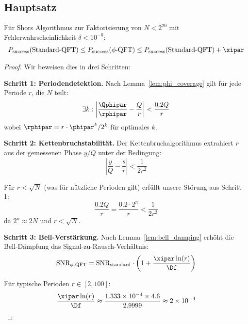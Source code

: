 \subsection{Hauptsatz}

\begin{theorem}
	\label{thm:main}
	Für Shors Algorithmus zur Faktorisierung von $N < 2^{20}$ mit Fehlerwahrscheinlichkeit $\delta < 10^{-6}$:
	\begin{equation}
		P_{\text{success}}(\text{Standard-QFT}) \leq P_{\text{success}}(\text{$\phi$-QFT}) \leq P_{\text{success}}(\text{Standard-QFT}) + \xipar
	\end{equation}
\end{theorem}

\begin{proof}
	Wir beweisen dies in drei Schritten:
	
	\textbf{Schritt 1: Periodendetektion.}
	Nach Lemma~\ref{lem:phi_coverage} gilt für jede Periode $r$, die $N$ teilt:
	\begin{equation}
		\exists k: \left|\frac{\Qphipar}{\rphipar} - \frac{Q}{r}\right| < \frac{0.2Q}{r}
	\end{equation}
	wobei $\rphipar = r \cdot \phipar^k/2^k$ für optimales $k$.
	
	\textbf{Schritt 2: Kettenbruchstabilität.}
	Der Kettenbruchalgorithmus extrahiert $r$ aus der gemessenen Phase $y/Q$ unter der Bedingung:
	\begin{equation}
		\left|\frac{y}{Q} - \frac{s}{r}\right| < \frac{1}{2r^2}
	\end{equation}
	
	Für $r < \sqrt{N}$ (was für nützliche Perioden gilt) erfüllt unsere Störung aus Schritt 1:
	\begin{equation}
		\frac{0.2Q}{r} = \frac{0.2 \cdot 2^n}{r} < \frac{1}{2r^2}
	\end{equation}
	da $2^n \approx 2N$ und $r < \sqrt{N}$.
	
	\textbf{Schritt 3: Bell-Verstärkung.}
	Nach Lemma~\ref{lem:bell_damping} erhöht die Bell-Dämpfung das Signal-zu-Rausch-Verhältnis:
	\begin{equation}
		\text{SNR}_{\text{$\phi$-QFT}} = \text{SNR}_{\text{standard}} \cdot \left(1 + \frac{\xipar \ln(r)}{\Df}\right)
	\end{equation}
	
	Für typische Perioden $r \in [2, 100]$:
	\begin{equation}
		\frac{\xipar \ln(r)}{\Df} \approx \frac{1.333 \times 10^{-4} \times 4.6}{2.9999} \approx 2 \times 10^{-4}
	\end{equation}
	

\end{proof}

